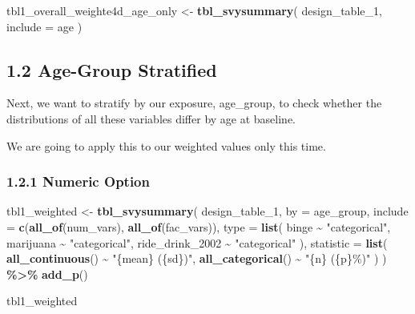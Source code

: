 \documentclass[
]{article}
\newenvironment{Shaded}{\begin{snugshade}}{\end{snugshade}}
\newcommand{\AttributeTok}[1]{\textcolor[rgb]{0.13,0.29,0.53}{#1}}
\newcommand{\FunctionTok}[1]{\textcolor[rgb]{0.13,0.29,0.53}{\textbf{#1}}}
\newcommand{\NormalTok}[1]{#1}
\newcommand{\OtherTok}[1]{\textcolor[rgb]{0.56,0.35,0.01}{#1}}
\newcommand{\SpecialCharTok}[1]{\textcolor[rgb]{0.81,0.36,0.00}{\textbf{#1}}}
\newcommand{\StringTok}[1]{\textcolor[rgb]{0.31,0.60,0.02}{#1}}
\begin{document}
\begin{Shaded}
\begin{Highlighting}[]
\NormalTok{tbl1\_overall\_weighte4d\_age\_only }\OtherTok{\textless{}{-}} \FunctionTok{tbl\_svysummary}\NormalTok{(}
\NormalTok{  design\_table\_1,}
  \AttributeTok{include =}\NormalTok{ age}
\NormalTok{)}
\end{Highlighting}
\end{Shaded}

\subsection{1.2 Age-Group Stratified}\label{age-group-stratified}

Next, we want to stratify by our exposure, age\_group, to check whether
the distributions of all these variables differ by age at baseline.

We are going to apply this to our weighted values only this time.

\subsubsection{1.2.1 Numeric Option}\label{numeric-option}

\begin{Shaded}
\begin{Highlighting}[]
\NormalTok{tbl1\_weighted }\OtherTok{\textless{}{-}} \FunctionTok{tbl\_svysummary}\NormalTok{(}
\NormalTok{  design\_table\_1,}
  \AttributeTok{by =}\NormalTok{ age\_group,}
  \AttributeTok{include =} \FunctionTok{c}\NormalTok{(}\FunctionTok{all\_of}\NormalTok{(num\_vars), }\FunctionTok{all\_of}\NormalTok{(fac\_vars)),}
  \AttributeTok{type =} \FunctionTok{list}\NormalTok{(}
\NormalTok{    binge }\SpecialCharTok{\textasciitilde{}} \StringTok{"categorical"}\NormalTok{,}
\NormalTok{    marijuana }\SpecialCharTok{\textasciitilde{}} \StringTok{"categorical"}\NormalTok{,}
\NormalTok{    ride\_drink\_2002 }\SpecialCharTok{\textasciitilde{}} \StringTok{"categorical"}
\NormalTok{  ),}
  \AttributeTok{statistic =} \FunctionTok{list}\NormalTok{(}
    \FunctionTok{all\_continuous}\NormalTok{() }\SpecialCharTok{\textasciitilde{}} \StringTok{"\{mean\} (\{sd\})"}\NormalTok{,}
    \FunctionTok{all\_categorical}\NormalTok{() }\SpecialCharTok{\textasciitilde{}} \StringTok{"\{n\} (\{p\}\%)"}
\NormalTok{  )}
\NormalTok{) }\SpecialCharTok{\%\textgreater{}\%}
  \FunctionTok{add\_p}\NormalTok{() }

\NormalTok{tbl1\_weighted}
\end{Highlighting}
\end{Shaded}
\end{document}
